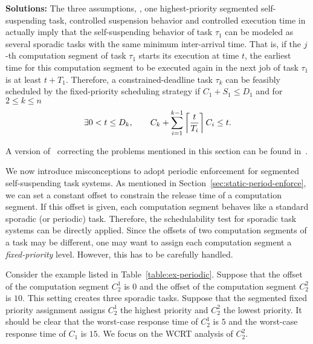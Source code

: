 {\bf Solutions:} The three assumptions, \ie, one highest-priority segmented self-suspending task, controlled suspension behavior and controlled execution time  in \cite{RTSS-KimANR13} actually imply that the self-suspending behavior of task $\tau_1$ can be modeled as several sporadic tasks with the same minimum inter-arrival time. That is, if the $j$-th computation segment of task $\tau_1$ starts its execution at time $t$, the earliest time for this computation segment to be executed again in the next job of task $\tau_1$ is at least $t+T_1$. Therefore, a constrained-deadline task $\tau_k$ can be feasibly scheduled by the fixed-priority scheduling strategy if $C_1+S_1 \leq D_1$ and for $2 \leq k \leq n$
  \begin{equation}
    \label{eq:tda-fixed}
\exists 0 < t \leq D_k, \qquad C_k + \sum_{i=1}^{k-1}\left\lceil{\frac{t}{T_i}}\right\rceil C_i \leq t.    
  \end{equation}

A version of~\cite{RTSS-KimANR13} correcting the problems mentioned in this section can be found in~\cite{Kim2016}.

\label{sec:wrong-periodic}

We now introduce misconceptions to adopt periodic enforcement for segmented self-suspending task systems. As mentioned in Section~\ref{sec:static-period-enforce}, we can set a constant offset to constrain the release time of a computation segment. If this offset is given, each computation segment behaves like a standard sporadic (or periodic) task. Therefore, the schedulability test for sporadic task systems can be directly applied. Since the offsets of two computation segments of a task may be different, one may want to assign each computation segment a \emph{fixed-priority} level.  However, this has to be carefully handled. 



Consider the example listed in Table~\ref{table:ex-periodic}. Suppose that the offset of the computation segment $C_2^1$ is $0$ and the offset of the computation segment $C_2^2$ is $10$. This setting creates three sporadic tasks.
Suppose that the segmented fixed priority assignment assigns $C_2^1$ the highest priority and $C_2^2$ the lowest priority. It should be clear that the worst-case response time of $C_2^1$ is $5$ and the worst-case response time of $C_1$ is $15$. We focus on the WCRT analysis of $C_2^2$.


